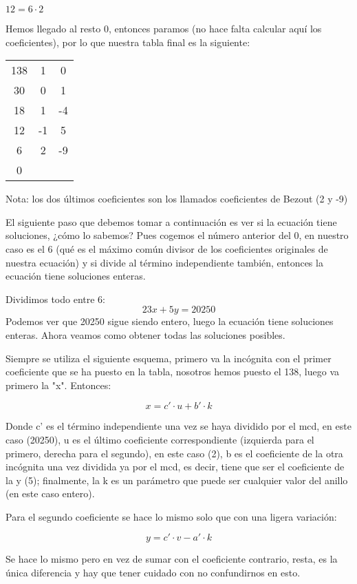 \documentclass[11pt, a4paper, titlepage]{article}
\theoremstyle{theorem-style}
\theoremstyle{definition-style}
\theoremstyle{remark-style}
\theoremstyle{example-style}
\begin{document}
$ 12 = 6 \cdot 2 $

Hemos llegado al resto 0, entonces paramos (no hace falta calcular aquí los coeficientes), por lo que
nuestra tabla final es la siguiente:


\begin{center}
\begin{tabular}{c|cc}
138 & 1 & 0 \\
30 & 0 & 1 \\
\hline
18 & 1 & -4 \\
\hline
12 & -1 & 5 \\
\hline
6 & 2 & -9 \\
\hline
0
\end{tabular}
\end{center}


Nota: los dos últimos coeficientes son los llamados coeficientes de Bezout (2 y -9)

El siguiente paso que debemos tomar a continuación es ver si la ecuación tiene soluciones, ¿cómo lo sabemos? Pues cogemos el número anterior del 0, en nuestro caso es el 6 (qué es el máximo común divisor de  los coeficientes originales de nuestra ecuación) y si divide al término independiente también, entonces la ecuación tiene soluciones enteras.

Dividimos todo entre 6:
$$ 23x + 5y = 20250 $$
Podemos ver que 20250 sigue siendo entero, luego la ecuación tiene soluciones enteras. Ahora veamos como
obtener todas las soluciones posibles.

Siempre se utiliza el siguiente esquema, primero va la incógnita con el primer coeficiente que se ha puesto en la tabla, nosotros hemos puesto el 138, luego va primero la "x". Entonces:

$$ x = c' \cdot u + b' \cdot k $$

Donde c' es el término independiente una vez se haya dividido por el mcd, en este caso (20250), u es el último coeficiente correspondiente (izquierda para el primero, derecha para el segundo), en este caso (2), b es el coeficiente de la otra incógnita una vez dividida ya por el mcd, es decir, tiene que ser el coeficiente de la y (5); finalmente, la k es un parámetro que puede ser cualquier valor del anillo (en este caso entero).

Para el segundo coeficiente se hace lo mismo solo que con una ligera variación:

$$ y = c' \cdot v - a' \cdot k $$

Se hace lo mismo pero en vez de sumar con el coeficiente contrario, resta, es la única diferencia y hay que tener cuidado con no confundirnos en esto.
\end{document}
